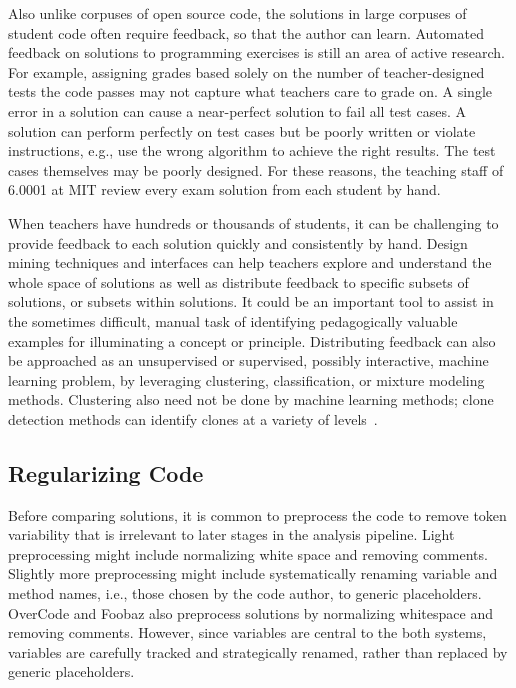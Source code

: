 Also unlike corpuses of open source code, the solutions in large corpuses of student code often require feedback, so that the author can learn. Automated feedback on solutions to programming exercises is still an area of active research. For example, assigning grades based solely on the number of teacher-designed tests the code passes may not capture what teachers care to grade on. A single error in a solution can cause a near-perfect solution to fail all test cases. A solution can perform perfectly on test cases but be poorly written or violate instructions, e.g., use the wrong algorithm to achieve the right results. The test cases themselves may be poorly designed. For these reasons, the teaching staff of 6.0001 at MIT review every exam solution from each student by hand.

When teachers have hundreds or thousands of students, it can be challenging to provide feedback to each solution quickly and consistently by hand. Design mining techniques and interfaces can help teachers explore and understand the whole space of solutions as well as distribute feedback to specific subsets of solutions, or subsets within solutions. It could be an important tool to assist in the sometimes difficult, manual task of identifying pedagogically valuable examples for illuminating a concept or principle. Distributing feedback can also be approached as an unsupervised or supervised, possibly interactive, machine learning problem, by leveraging clustering, classification, or mixture modeling methods. Clustering also need not be done by machine learning methods; clone detection methods can identify clones at a variety of levels~\cite{roy2009comparison}.


\subsection{Regularizing Code}
Before comparing solutions, it is common to preprocess the code to remove token variability that is irrelevant to later stages in the analysis pipeline. Light preprocessing might include normalizing white space and removing comments. Slightly more preprocessing might include systematically renaming variable and method names, i.e., those chosen by the code author, to generic placeholders. OverCode and Foobaz also preprocess solutions by normalizing whitespace and removing comments. However, since variables are central to the both systems, variables are carefully tracked and strategically renamed, rather than replaced by generic placeholders.

